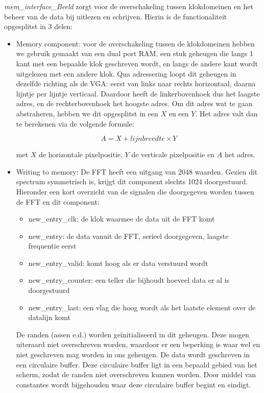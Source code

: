 \documentclass[a4paper,kul]{kulakarticle} %
\begin{document}
\textit{mem\_interface\_Beeld} zorgt voor de overschakeling tussen klokdomeinen en het beheer van de data bij uitlezen en schrijven. Hierin is de functionaliteit opgesplitst in 3 delen:
\begin{itemize}
	\item Memory component: voor de overschakeling tussen de klokdomeinen hebben we gebruik gemaakt van een dual port RAM, een stuk geheugen die langs 1 kant met een bepaalde klok geschreven wordt, en langs de andere kant wordt uitgelezen met een andere klok. Qua adressering loopt dit geheugen in dezelfde richting als de VGA: eerst van links naar rechts horizontaal, daarna lijntje per lijntje verticaal. Daardoor heeft de linkerbovenhoek dus het laagste adres, en de rechterbovenhoek het hoogste adres. Om dit adres wat te gaan abstraheren, hebben we dit opgesplitst in een $X$ en een $Y$. Het adres valt dan te berekenen via de volgende formule:
	
	$$ A = X + lijnbreedte \times Y $$
	
	met $X$ de horizontale pixelpositie, $Y$ de verticale pixelpositie en $A$ het adres.
	
	\item Writing to memory: De FFT heeft een uitgang van 2048 waarden. Gezien dit spectrum symmetrisch is, krijgt dit component slechts 1024 doorgestuurd. Hieronder een kort overzicht van de signalen die doorgegeven worden tussen de FFT en dit component:
	\begin{itemize}
		\item new\_entry\_clk: de klok waarmee de data uit de FFT komt
		\item new\_entry: de data vanuit de FFT, serieel doorgegeven, laagste frequentie eerst
		\item new\_entry\_valid: komt hoog als er data verstuurd wordt
		\item new\_entry\_counter: een teller die bijhoudt hoeveel data er al is doorgestuurd
		\item new\_entry\_last: een vlag die hoog wordt als het laatste element over de datalijn komt
	\end{itemize}
	De randen (assen e.d.) worden geïnitialiseerd in dit geheugen. Deze mogen uiteraard niet overschreven worden, waardoor er een beperking is waar wel en niet geschreven mag worden in ons geheugen. De data wordt geschreven in een circulaire buffer. Deze circulaire buffer ligt in een bepaald gebied van het scherm, zodat de randen niet overschreven kunnen worden. Door middel van constantes wordt bijgehouden waar deze circulaire buffer begint en eindigt. \\
	

\end{itemize}
\end{document}
